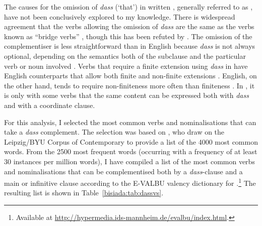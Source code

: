 \documentclass[output=paper]{LSP/langsci}
\begin{document}
The causes for the omission of \emph{dass} (`that') in written , generally referred to as , have not been conclusively explored to my knowledge. There is widespread agreement that the verbs allowing the omission of \emph{dass} are the same as the verbs known as \enquote{bridge verbs} \parencites[54]{grewendorf89}[362--363]{mueller93}[8]{steinbach02}, though this has been refuted by \textcite{reis95}. The omission of the complementiser is less straightforward than in English because \emph{dass} is not always optional, depending on the semantics both of the subclause and the particular verb or noun involved \parencites{mueller93}{gaeste94}[for an overview of some literature, see][30]{lapshinova09}. Verbs that require a finite extension using \emph{dass} in  have English counterparts that allow both finite and non-finite extensions \parencite[214]{fischer97}. English, on the other hand, tends to require non-finiteness more often than finiteness \parencite[214]{fischer97}. In , it is only with some verbs that the same content can be expressed both with \emph{dass} and with a coordinate clause.

For this analysis, I selected the most common  verbs and nominalisations that can take a \emph{dass} complement. The selection was based on \textcite{jontsc06}, who draw on the Leipzig\slash BYU Corpus of Contemporary  to provide a list of the 4000 most common  words. From the 2500 most frequent  words (occurring with a frequency of at least 30 instances per million words), I have compiled a list of the most common verbs and nominalisations that can be complementised both by a \emph{dass}-clause and a main or infinitive clause according to the E-VALBU valency dictionary for  \parencite{schetal04}.\footnote{Available at \url{http://hypermedia.ids-mannheim.de/evalbu/index.html}.} The resulting list is shown in Table~\ref{bisiada:tab:dassvs}.
\end{document}
